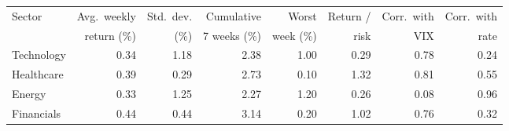 \begin{tabular}{@{}lrrrrrrr@{}}
\toprule
Sector & Avg.\ weekly & Std.\ dev. & Cumulative & Worst & Return / & Corr.\ with & Corr.\ with \\
       & return (\%) & (\%) & 7 weeks (\%) & week (\%) & risk & VIX & rate \\
\midrule
Technology & 0.34 & 1.18 & 2.38 & \textminus{}1.00 & 0.29 & \textminus{}0.78 & \textminus{}0.24 \\
Healthcare & 0.39 & 0.29 & 2.73 & \textminus{}0.10 & 1.32 & \textminus{}0.81 & 0.55 \\
Energy & 0.33 & 1.25 & 2.27 & \textminus{}1.20 & 0.26 & 0.08 & 0.96 \\
Financials & 0.44 & 0.44 & 3.14 & \textminus{}0.20 & 1.02 & \textminus{}0.76 & \textminus{}0.32 \\
\bottomrule
\end{tabular}